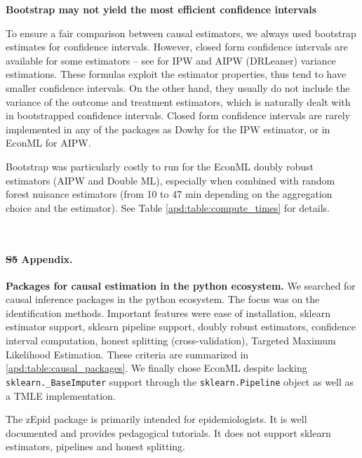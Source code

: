 \documentclass[10pt,letterpaper]{article}
\providecommand{\DIFaddtex}[1]{{\protect\color{blue}\uwave{#1}}} %
\providecommand{\DIFdeltex}[1]{{\protect\color{red}\sout{#1}}}                      %
\providecommand{\DIFaddbegin}{} %
\providecommand{\DIFaddend}{} %
\providecommand{\DIFdelbegin}{} %
\providecommand{\DIFdelend}{} %
\providecommand{\DIFadd}[1]{\texorpdfstring{\DIFaddtex{#1}}{#1}} %
\providecommand{\DIFdel}[1]{\texorpdfstring{\DIFdeltex{#1}}{}} %
\newcommand{\DIFscaledelfig}{0.5}
\newlength{\DIFdelgraphicswidth} %
\newlength{\DIFdelgraphicsheight} %
\newcommand{\DIFaddincludegraphics}[2][]{{\color{blue}\fbox{\DIFOincludegraphics[#1]{#2}}}} %
\newcommand{\DIFdelincludegraphics}[2][]{%
\sbox{\DIFdelgraphicsbox}{\DIFOincludegraphics[#1]{#2}}%
\settoboxwidth{\DIFdelgraphicswidth}{\DIFdelgraphicsbox} %
\settoboxtotalheight{\DIFdelgraphicsheight}{\DIFdelgraphicsbox} %
\scalebox{\DIFscaledelfig}{%
\parbox[b]{\DIFdelgraphicswidth}{\usebox{\DIFdelgraphicsbox}\\[-\baselineskip] \rule{\DIFdelgraphicswidth}{0em}}\llap{\resizebox{\DIFdelgraphicswidth}{\DIFdelgraphicsheight}{%
\setlength{\unitlength}{\DIFdelgraphicswidth}%
\begin{picture}(1,1)%
\thicklines\linethickness{2pt} %
{\color[rgb]{1,0,0}\put(0,0){\framebox(1,1){}}}%
{\color[rgb]{1,0,0}\put(0,0){\line( 1,1){1}}}%
{\color[rgb]{1,0,0}\put(0,1){\line(1,-1){1}}}%
\end{picture}%
}\hspace*{3pt}}} %
} %
\DeclareRobustCommand{\DIFaddbegin}{\DIFOaddbegin \let\includegraphics\DIFaddincludegraphics} %
\DeclareRobustCommand{\DIFaddend}{\DIFOaddend \let\includegraphics\DIFOincludegraphics} %
\DeclareRobustCommand{\DIFdelbegin}{\DIFOdelbegin \let\includegraphics\DIFdelincludegraphics} %
\DeclareRobustCommand{\DIFdelend}{\DIFOaddend \let\includegraphics\DIFOincludegraphics} %
\begin{document}
\textbf{Bootstrap may not yield the most efficient confidence intervals}

To ensure a fair comparison between causal estimators, we always used
bootstrap estimates for confidence intervals. However, closed form
confidence intervals are available for some estimators -- see \cite{wager2020stats}
for IPW and AIPW (DRLeaner) variance estimations. These formulas exploit the
estimator properties, thus tend to have smaller confidence intervals. On the
other hand, they usually do not include the variance of the outcome and
treatment estimators, which is naturally dealt with in bootstrapped confidence
intervals. Closed form confidence intervals are rarely implemented in any of the
packages as Dowhy for the IPW estimator, or in EconML for AIPW.

Bootstrap was particularly costly to run for the EconML doubly robust
estimators (AIPW and Double ML), especially when combined with random forest nuisance
estimators (from 10 to 47 min depending on the aggregation choice and the
estimator). See Table \ref{apd:table:compute_times} for details.

\begin{table}[]
  \centering\small
  
  \\
  \caption{Compute times for the different estimation methods with 50 bootstrap replicates.}\label{apd:table:compute_times}
\end{table}
\clearpage


\paragraph*{\DIFdelbegin \DIFdel{S5 }\DIFdelend \DIFaddbegin \DIFadd{S4 }\DIFaddend Appendix.}
\label{apd:packages}
{\bf Packages for causal estimation in the python ecosystem.}
We searched for causal inference packages in the python ecosystem. The focus
was on the identification methods. Important features were ease of
installation, sklearn estimator support, sklearn pipeline support, doubly
robust estimators, confidence interval computation, honest splitting
(cross-validation), Targeted Maximum Likelihood Estimation. These criteria are
summarized in \ref{apd:table:causal_packages}. We finally chose EconML despite
lacking \texttt{sklearn.\_BaseImputer} support through the
\texttt{sklearn.Pipeline} object as well as a TMLE implementation.

The zEpid package is primarily intended for epidemiologists. It is well documented
and provides pedagogical tutorials. It does not support sklearn estimators,
pipelines and honest splitting.
\end{document}
